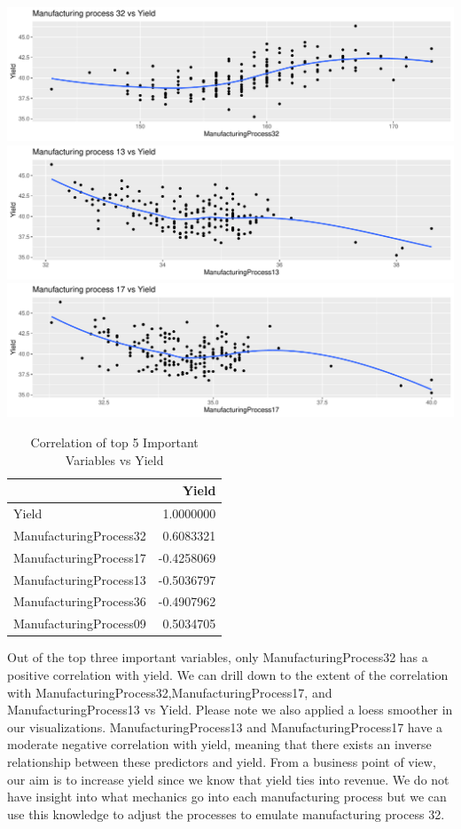 \documentclass[]{report}
\begin{document}
\includegraphics{Homework-Two_files/figure-latex/kj-6.3f-1.pdf}
\includegraphics{Homework-Two_files/figure-latex/kj-6.3f-2.pdf}
\includegraphics{Homework-Two_files/figure-latex/kj-6.3f-3.pdf}

\begin{table}[H]

\caption{\label{tab:kj-6.3f}Correlation of top 5 Important Variables vs Yield}
\centering
\begin{tabular}[t]{l|r}
\hline
  & Yield\\
\hline
\rowcolor{gray!6}  Yield & 1.0000000\\
\hline
ManufacturingProcess32 & 0.6083321\\
\hline
\rowcolor{gray!6}  ManufacturingProcess17 & -0.4258069\\
\hline
ManufacturingProcess13 & -0.5036797\\
\hline
\rowcolor{gray!6}  ManufacturingProcess36 & -0.4907962\\
\hline
ManufacturingProcess09 & 0.5034705\\
\hline
\end{tabular}
\end{table}

Out of the top three important variables, only ManufacturingProcess32
has a positive correlation with yield. We can drill down to the extent
of the correlation with ManufacturingProcess32,ManufacturingProcess17,
and ManufacturingProcess13 vs Yield. Please note we also applied a loess
smoother in our visualizations. ManufacturingProcess13 and
ManufacturingProcess17 have a moderate negative correlation with yield,
meaning that there exists an inverse relationship between these
predictors and yield. From a business point of view, our aim is to
increase yield since we know that yield ties into revenue. We do not
have insight into what mechanics go into each manufacturing process but
we can use this knowledge to adjust the processes to emulate
manufacturing process 32.
\end{document}
